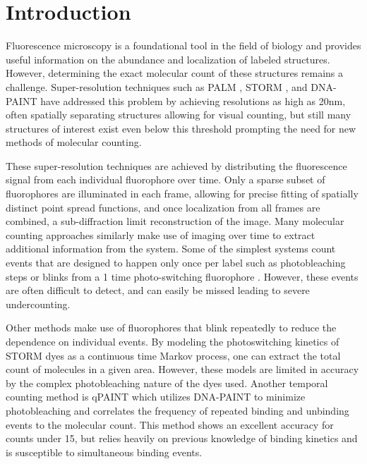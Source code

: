\section{Introduction}

Fluorescence microscopy is a foundational tool in the field of biology and
provides useful information on the abundance and localization of labeled
structures.
%
  However, determining the exact molecular count of these structures remains a
  challenge. Super-resolution techniques such as PALM \cite{betzig_imaging_2006}, 
  STORM \cite{rust_sub-diffraction-limit_2006}
  , and DNA-PAINT \cite{schnitzbauer_super-resolution_2017} have
  addressed this problem by achieving resolutions as high as 20nm, often
  spatially separating structures allowing for visual counting, but still many
  structures of interest exist even below this threshold prompting the need for
  new methods of molecular counting.

These super-resolution techniques are achieved by distributing the fluorescence
signal from each individual fluorophore over time.
%
  Only a sparse subset of fluorophores are illuminated in each frame, allowing
  for precise fitting of spatially distinct point spread functions, and once
  localization from all frames are combined, a sub-diffraction limit
  reconstruction of the image. Many molecular counting approaches similarly
  make use of imaging over time to extract additional information from the
  system. Some of the simplest systems count events that are designed to happen
  only once per label such as photobleaching steps \cite{Ulbrich_subunit_2007} or
  blinks from a 1 time photo-switching fluorophore
  \cite{gunzenhauser_quantitative_2012}. However, these events are often difficult to
  detect, and can easily be missed leading to severe undercounting.

Other methods make use of fluorophores that blink repeatedly to reduce the
dependence on individual events.
%
  By modeling the photoswitching kinetics of STORM dyes as a continuous time
  Markov process, \cite{patel_blinking_2021, rollins_stochastic_2015} one can extract the total count of molecules
  in a given area. However, these models are limited in accuracy by the complex
  photobleaching nature of the dyes used. Another temporal counting method is
  qPAINT \cite{jungmann_quantitative_2016} which utilizes DNA-PAINT to minimize photobleaching and
  correlates the frequency of repeated binding and unbinding events to the
  molecular count. This method shows an excellent accuracy for counts under 15,
  but relies heavily on previous knowledge of binding kinetics and is
  susceptible to simultaneous binding events.

